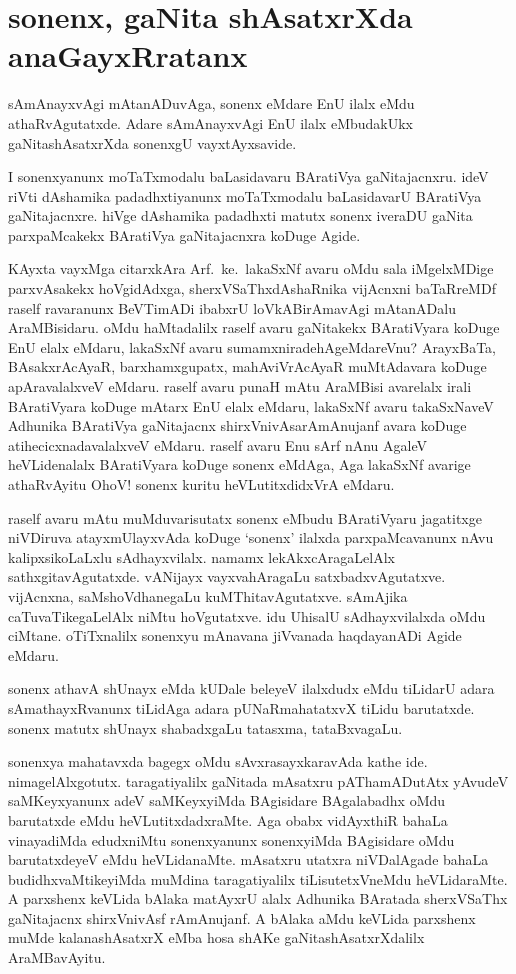 \chapter{sonenx, gaNita shAsatxrXda anaGayxRratanx}
\vskip -20pt

sAmAnayxvAgi mAtanADuvAga, sonenx eMdare EnU ilalx eMdu athaRvAgutatxde. Adare sAmAnayxvAgi EnU ilalx eMbudakUkx gaNitashAsatxrXda sonenxgU vayxtAyxsavide.

I sonenxyanunx moTaTxmodalu baLasidavaru BAratiVya gaNitajacnxru. ideV riVti dAshamika padadhxtiyanunx moTaTxmodalu baLasidavarU BAratiVya gaNitajacnxre. hiVge dAshamika padadhxti matutx sonenx iveraDU gaNita parxpaMcakekx BAratiVya gaNitajacnxra koDuge Agide.

KAyxta vayxMga citarxkAra Arf.~ke.\ lakaSxNf avaru oMdu sala iMgelxMDige parxvAsakekx hoVgidAdxga, sherxVSaThxdAshaRnika vijAcnxni baTaRreMDf raself ravaranunx BeVTimADi ibabxrU loVkABirAmavAgi mAtanADalu AraMBisidaru. oMdu haMtadalilx raself avaru gaNitakekx BAratiVyara koDuge EnU elalx eMdaru, lakaSxNf avaru sumamxnirade\-hAgeMdareVnu? ArayxBaTa, BAsakxrAcAyaR, barxhamxgupatx, mahAviVrAcAyaR muMtA\-davara koDuge apAravalalxveV eMdaru. raself avaru punaH mAtu AraMBisi avarelalx irali BAratiVyara koDuge mAtarx EnU elalx eMdaru, lakaSxNf avaru takaSxNaveV Adhunika BAratiVya gaNitajacnx shirxVnivAsarAmAnujanf avara koDuge atihecicxnadavalalxveV \-eMdaru. raself avaru Enu sArf nAnu AgaleV heVLidenalalx BAratiVyara koDuge \-sonenx eMdAga, Aga lakaSxNf avarige athaRvAyitu OhoV! sonenx kuritu heVLutitxdidxVrA eMdaru.

raself avaru mAtu muMduvarisutatx sonenx eMbudu BAratiVyaru jagatitxge niVDiruva atayxmUlayxvAda koDuge `sonenx' ilalxda parxpaMcavanunx nAvu kalipxsikoLaLxlu sAdhayxvilalx. namamx lekAkxcAragaLelAlx sathxgitavAgutatxde. vANijayx vayxvahAragaLu satxbadxvAgu\-tatxve. vijAcnxna, saMshoVdhanegaLu kuMThitavAgutatxve. sAmAjika caTuvaTikegaLelAlx niMtu hoVgutatxve. idu UhisalU sAdhayxvilalxda oMdu ciMtane. oTiTxnalilx sonenxyu mAnavana jiVvanada haqdayanADi Agide eMdaru. 

sonenx athavA shUnayx eMda kUDale beleyeV ilalxdudx eMdu tiLidarU adara sAmathayxRvanunx tiLidAga adara pUNaRmahatatxvX tiLidu barutatxde. sonenx matutx shUnayx shabadxgaLu tatasxma, tataBxvagaLu.

sonenxya mahatavxda bagegx oMdu sAvxrasayxkaravAda kathe ide. nimagelAlxgotutx. taragatiyalilx gaNitada mAsatxru pAThamADutAtx yAvudeV saMKeyxyanunx adeV saMKeyxyiMda BAgisidare BAgalabadhx oMdu barutatxde eMdu heVLutitxdadxraMte. Aga obabx \-vidAyxthiR bahaLa vinayadiMda edudxniMtu sonenxyanunx sonenxyiMda BAgisidare oMdu barutatxdeyeV eMdu heVLidanaMte. mAsatxru utatxra niVDalAgade bahaLa budidhx\-vaMtikeyiMda muMdina taragatiyalilx tiLisutetxVneMdu heVLidaraMte. A parxshenx keVLida bAlaka matAyxrU alalx Adhunika BAratada sherxVSaThx gaNitajacnx shirxVnivAsf rAmAnujanf. A bAlaka aMdu keVLida parxshenx muMde kalanashAsatxrX eMba hosa shAKe gaNitashAsatxrXdalilx \-AraMBavAyitu.

